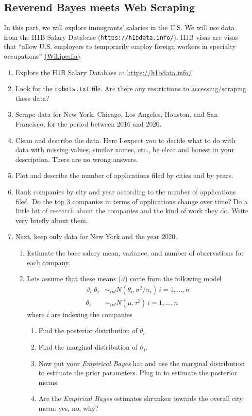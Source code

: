 \documentclass[12pt,onecolumn]{article}
\begin{document}
\subsection{Reverend Bayes meets Web Scraping}

In this part, we will explore immigrants' salaries in the U.S. We will use data from the H1B Salary Database (\texttt{https://h1bdata.info/}). H1B visas are visas that ``allow U.S. employers to temporarily employ foreign workers in specialty occupations'' \href{https://en.wikipedia.org/wiki/H-1B_visa}{(Wikipedia)}. 

\begin{enumerate}
  \item Explore the H1B Salary Database at \url{https://h1bdata.info/}
  \item Look for the \texttt{robots.txt} file. Are there any restrictions to accessing/scraping these data?
  \item Scrape data for New York, Chicago, Los Angeles, Houston, and San Francisco, for the period between 2016 and 2020.
  \item Clean and describe the data. Here I expect you to decide what to do with data with missing values, similar names, etc., be clear and honest in your description. There are no wrong answers.
  \item Plot and describe the number of applications filed by cities and by years.
  \item Rank companies by city and year according to the number of applications filed. Do the top 3 companies in terms of applications change over time?  Do a little bit of research about the companies and the kind of work they do. Write very briefly about them. 
  \item Next, keep only data for New York and the year 2020.
  \begin{enumerate}
	  \item Estimate the base salary mean, variance, and number of observations for each company.
	  \item Lets assume that these means ($\vartheta$) come from the following model
	  \begin{align}
	  \vartheta_i|\theta_i &\sim_{iid} N(\theta_i,\sigma^2/n_i) \, i=1,\dots,n \\
	  \theta_i &\sim_{iid} N(\mu,\tau^2) \, i=1,\dots,n 
	  \end{align}
	  \noindent where $i$ are indexing the companies
	  \begin{enumerate}
	  	\item Find the posterior distribution of $\theta_i$
	    \item Find the marginal distribution of $\vartheta_i$.
	    \item Now put your {\it Empirical Bayes} hat and use the marginal distribution to estimate the prior parameters. Plug in to estimate the posterior means. 
	    \item Are the {\it Empirical Bayes} estimates shrunken towards the overall city mean: yes, no, why?
	  \end{enumerate}
  \end{enumerate}
\end{enumerate}
\end{document}
